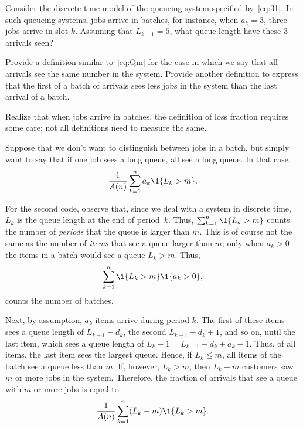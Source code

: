 \begin{exercise} Consider the discrete-time model of the queueing system specified by~\cref{eq:31}.
In such queueing systems, jobs arrive in batches, for instance, when $a_k=3$, three jobs arrive in slot $k$.
Assuming that $L_{k-1}=5$, what queue length have these 3 arrivals seen?  

Provide a definition similar to~\cref{eq:Qm} for the case in which we say that all arrivals see the same number in the system.
Provide another definition to express that the first of a batch of arrivals sees less jobs in the system than the last arrival of a batch. 
\begin{hint}
Realize that when jobs arrive in batches, the definition of loss fraction requires some care; not all definitions need to measure the same.
\end{hint}
\begin{solution} 

Suppose that we don't want to distinguish between jobs in a batch, but simply want to say that if one job sees a long queue, all see a long queue.
In that case,
\begin{equation*}
\frac 1{A(n)}\sum_{k=1}^n a_k \1{L_k > m}.
\end{equation*}


For the second code, observe that, since we deal with a system in discrete time, $L_k$ is the queue length at the end of period~$k$.
Thus, $\sum_{k=1}^n \1{L_k > m}$ counts the number of \emph{periods} that the queue is larger than $m$.
This is of course not the same as the number of \emph{items} that see a queue larger than $m$; only when $a_k>0$ the items in a batch would see a queue $L_k>m$.
Thus,
\begin{equation*}
  \sum_{k=1}^n \1{L_k > m} \1{a_k > 0},
\end{equation*}
counts the number of batches. 

Next, by assumption, $a_k$ items arrive during period $k$.
The first of these items sees a queue length of $L_{k-1} - d_k$, the second $L_{k-1}-d_k + 1$, and so on, until the last item, which sees a queue length of $L_k-1 = L_{k-1} - d_k + a_k -1$.
Thus, of all items, the last item sees the largest queue.
Hence, if $L_k \leq m$, all items of the batch see a queue less than $m$.
If, however, $L_k > m$, then $L_k -m$ customers saw $m$ or more jobs in the system.
Therefore, the fraction of arrivals that see a queue with $m$ or more jobs is equal to
\begin{equation*}
 \frac 1 {A(n)} \sum_{k=1}^n (L_k - m) \1{L_k > m} .
\end{equation*}


\end{solution}
\end{exercise}
